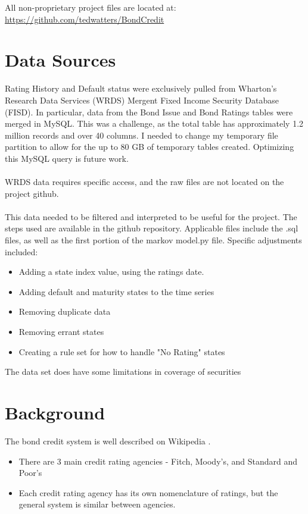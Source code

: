 \documentclass[a4paper, 11pt]{article}
\begin{document}
All non-proprietary project files are located at: \url{https://github.com/tedwatters/BondCredit}

\section{Data Sources}

Rating History and Default status were exclusively pulled from Wharton's Research Data Services (WRDS) Mergent Fixed Income Security Database (FISD)\cite{wrds}. In particular, data from the Bond Issue and Bond Ratings tables were merged in MySQL. This was a challenge, as the total table has approximately 1.2 million records and over 40 columns. I needed to change my temporary file partition to allow for the up to 80 GB of temporary tables created. Optimizing this MySQL query is future work.\\
\\
WRDS data requires specific access, and the raw files are not located on the project github.\\
\\
This data needed to be filtered and interpreted to be useful for the project. The steps used are available in the github repository. Applicable files include the .sql files, as well as the first portion of the markov model.py file. Specific adjustments included:

\begin{itemize}
	\item Adding a state index value, using the ratings date.
	\item Adding default and maturity states to the time series
	\item Removing duplicate data
	\item Removing errant states
	\item Creating a rule set for how to handle "No Rating" states
	
\end{itemize}

The data set does have some limitations in coverage of securities\cite{wrds-coverage}
\section{Background}

The bond credit system is well described on Wikipedia \cite{wiki_bondcredit}.

\begin{itemize}
	\item There are 3 main credit rating agencies - Fitch, Moody's, and Standard and Poor's
	\item Each credit rating agency has its own nomenclature of ratings, but the general system is similar between agencies.	
\end{itemize}
\end{document}
